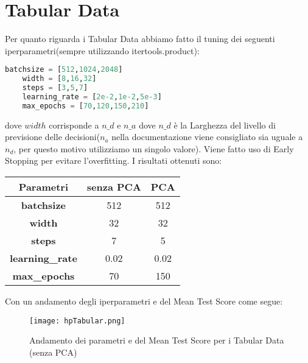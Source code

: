 \documentclass[../../Report.tex]{subfiles}
\begin{document}
\section{Tabular Data}
Per quanto riguarda i Tabular Data abbiamo fatto il tuning dei seguenti iperparametri(sempre utilizzando itertools.product):
\begin{lstlisting}[language=Python]
    batchsize = [512,1024,2048]
    width = [8,16,32]
    steps = [3,5,7]
    learning_rate = [2e-2,1e-2,5e-3]    
    max_epochs = [70,120,150,210]
\end{lstlisting}
dove $width$ corrisponde a $n\_d$ e $n\_a$ dove $n\_d$ è la Larghezza del livello di previsione delle decisioni($n_a$ nella documentazione viene consigliato sia uguale a $n_d$, per questo motivo utilizziamo un singolo valore).
Viene fatto uso di Early Stopping per evitare l'overfitting.
I risultati ottenuti sono:
\begin{table}[h]
    \centering
    \begin{tabular}{|c|c|c|}
    \hline
    \textbf{Parametri} & \textbf{senza PCA} & \textbf{PCA} \\ \hline
    \textbf{batchsize}& 512 & 512 \\
    \textbf{width}& 32 & 32\\
    \textbf{steps}& 7 & 5\\
    \textbf{learning\_rate}&  0.02 & 0.02 \\
    \textbf{max\_epochs}& 70& 150 \\
    \hline
    \end{tabular}
\end{table}

Con un andamento degli iperparametri e del Mean Test Score come segue:
\begin{figure}[H]
    \centering
    \texttt{[image: hpTabular.png]}
    \caption{Andamento dei parametri e del Mean Test Score per i Tabular Data (senza PCA)}
\end{figure}
\end{document}
